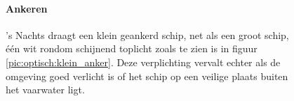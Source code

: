 \begin{figure}[H]
	\centering
	\begin{minipage}[t]{0.50\textwidth}
		\paragraph{Ankeren}
		's Nachts draagt een klein geankerd schip, net als een groot schip, één wit rondom schijnend toplicht zoals te zien is in figuur \ref{pic:optisch:klein_anker}. Deze verplichting vervalt echter als de omgeving goed verlicht is of het schip op een veilige plaats buiten het vaarwater ligt.
	\end{minipage}
	\hfill
	\begin{minipage}[t]{0.22\textwidth}
		\RemoveLine
		\caption{}
		\label{pic:optisch:klein_anker}
	\end{minipage}
	\hfill
	\begin{minipage}[t]{0.22\textwidth}
		\RemoveLine
		\caption{}
		\label{pic:optisch:klein_anker2}
	\end{minipage}
\end{figure}%
